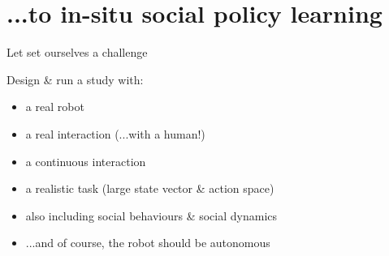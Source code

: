 \documentclass[xcolor=table]{beamer}
\begin{document}
\section[Social policy learning]{...to in-situ social policy learning}




\begin{frame}{Let set ourselves a challenge}

    Design \& run a study with:
    
    \begin{itemize}
        \item<+-> a real robot
        \item<+-> a real interaction (...with a human!)
        \item<+-> a continuous interaction
        \item<+-> a realistic task (large state vector \& action space)
        \item<+-> also including social behaviours \& social dynamics
        \item<+-> ...and of course, the robot should be autonomous
    \end{itemize}

\end{frame}
\end{document}

